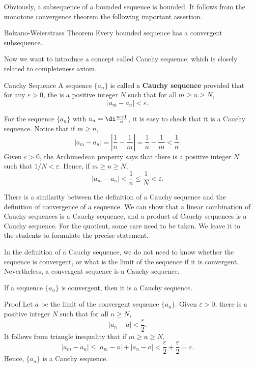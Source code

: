  Obviously, a subsequence of a bounded sequence is bounded. It follows from the monotone convergence theorem the following important assertion.
 \begin{theorem}{Bolzano-Weierstrass Theorem}
 Every bounded sequence has a convergent subsequence.
 \end{theorem}
 


Now we want to introduce a concept called Cauchy sequence, which is closely related to completeness axiom.
\begin{definition}{Cauchy Sequence}
A sequence $\{a_n\}$ is called a {\bf Cauchy sequence} provided that for any $\varepsilon>0$, the is a positive integer $N$ such that for all $m\geq n\geq N$,
\[|a_m-a_n|<\varepsilon.\]

\end{definition}
\begin{example}{}
For the sequence $\{a_n\}$ with $a_n=\di\frac{n+1}{n}$,  it is easy to check that it is a Cauchy sequence. Notice that if $m\geq n$,
\[|a_m-a_n|=\left|\frac{1}{n}-\frac{1}{m}\right|=\frac{1}{n}-\frac{1}{m}<\frac{1}{n}.\]
Given $\varepsilon>0$, the Archimedean property says that there is a positive integer $N$ such that $1/N<\varepsilon$. Hence, if $m\geq n\geq N$,
\[|a_m-a_n|<\frac{1}{n}\leq\frac{1}{N}<\varepsilon.\]
\end{example}

There is a similarity between the definition of a Cauchy sequence  and the definition of convergence of a sequence.  We can show that a linear combination of Cauchy sequences is a Cauchy sequence, and a product of Cauchy sequences is a Cauchy sequence. For the quotient, some care need to be taken.   We leave it to the students to formulate the precise statement.




In the definition of a Cauchy sequence, we do not need to know whether the sequence is convergent, or what is the limit of the sequence if it is convergent.
Nevertheless,   a convergent sequence is a Cauchy sequence.

\begin{theorem}[label=23020602]{}
If a sequence $\{a_n\}$ is convergent, then it is a Cauchy sequence.
\end{theorem}
\begin{myproof}{Proof}
Let $a$ be the limit of the convergent sequence $\{a_n\}$. Given $\varepsilon>0$, there is a positive integer $N$ such that for all $n\geq N$,
\[ |a_n-a|<\frac{\varepsilon}{2}.\]
It follows from triangle inequality that if $m\geq n\geq N$,
\[|a_m-a_n|\leq |a_m-a|+|a_n-a|<\frac{\varepsilon}{2}+\frac{\varepsilon}{2}=\varepsilon.\]
Hence, $\{a_n\}$ is a Cauchy sequence.
\end{myproof}

